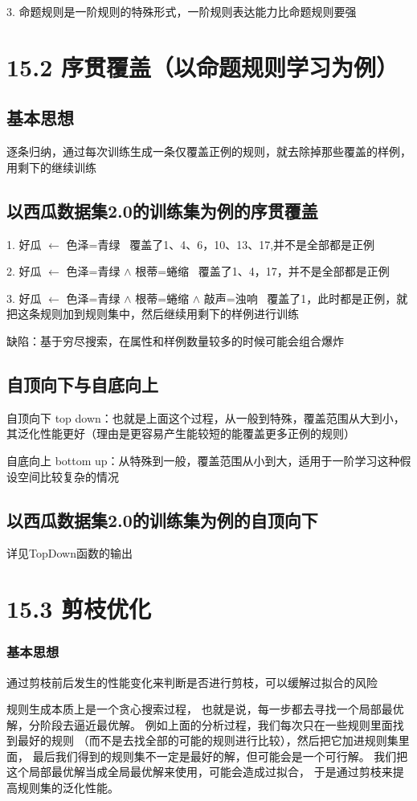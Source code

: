 \documentclass[UTF8]{article}
\begin{document}
    3. 命题规则是一阶规则的特殊形式，一阶规则表达能力比命题规则要强

\section{15.2 序贯覆盖（以命题规则学习为例）}
\subsection{基本思想}
    逐条归纳，通过每次训练生成一条仅覆盖正例的规则，就去除掉那些覆盖的样例，用剩下的继续训练
\subsection{以西瓜数据集2.0的训练集为例的序贯覆盖}  
    1. 好瓜 $\leftarrow$ 色泽=青绿 
    ~覆盖了1、4、6，10、13、17,并不是全部都是正例  
    
    2. 好瓜 $\leftarrow$ 色泽=青绿 $\wedge$ 根蒂=蜷缩 
    ~覆盖了1、4，17，并不是全部都是正例  
    
    3. 好瓜 $\leftarrow$ 色泽=青绿 $\wedge$ 根蒂=蜷缩 $\wedge$ 敲声=浊响 
    ~覆盖了1，此时都是正例，就把这条规则加到规则集中，然后继续用剩下的样例进行训练
    
    缺陷：基于穷尽搜索，在属性和样例数量较多的时候可能会组合爆炸
\subsection{自顶向下与自底向上}
    自顶向下 top down：也就是上面这个过程，从一般到特殊，覆盖范围从大到小，其泛化性能更好（理由是更容易产生能较短的能覆盖更多正例的规则）
    
    自底向上 bottom up：从特殊到一般，覆盖范围从小到大，适用于一阶学习这种假设空间比较复杂的情况
\subsection{以西瓜数据集2.0的训练集为例的自顶向下}
    详见TopDown函数的输出

\section{15.3 剪枝优化}
\subsubsection{基本思想}
    通过剪枝前后发生的性能变化来判断是否进行剪枝，可以缓解过拟合的风险
    
    规则生成本质上是一个贪心搜索过程，
    也就是说，每一步都去寻找一个局部最优解，分阶段去逼近最优解。
    例如上面的分析过程，我们每次只在一些规则里面找到最好的规则
    （而不是去找全部的可能的规则进行比较），然后把它加进规则集里面，
    最后我们得到的规则集不一定是最好的解，但可能会是一个可行解。
    我们把这个局部最优解当成全局最优解来使用，可能会造成过拟合，
    于是通过剪枝来提高规则集的泛化性能。
\end{document}
